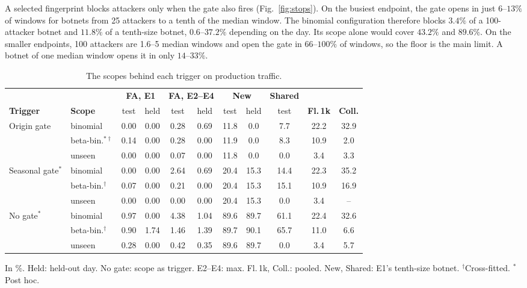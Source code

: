 \documentclass[conference,letterpaper,10pt]{IEEEtran}
\newcommand\1{\textit{(i)}}
\newcommand\2{\textit{(ii)}}
\newcommand\3{\textit{(iii)}}
\newcommand\4{\textit{(iv)}}
\newcommand\5{\textit{(v)}}
\newcommand\6{\textit{(vi)}}
\newcommand\7{\textit{(vii)}}
\newcommand\8{\textit{(viii)}}
\newcommand\9{\textit{(ix)}}
\begin{document}
A selected fingerprint blocks attackers only when the gate also fires
(Fig.~\ref{fig:stops}). On the busiest endpoint,
the gate opens in just $6$--$13\%$ of windows
for botnets from 25 attackers to a tenth of the median
window. The binomial
configuration therefore blocks $3.4\%$
of a 100-attacker botnet and $11.8\%$
of a tenth-size botnet, $0.6$--$37.2\%$ depending on the day.
Its scope alone would cover $43.2\%$ and $89.6\%$.
On the smaller endpoints, 100 attackers are 1.6--5 median
windows and open the gate in $66$--$100\%$ of windows, so
the floor is the main limit. A botnet of one median window
opens it in only $14$--$33\%$.

\begin{table}[t]
\centering
\caption{The scopes behind each trigger on production traffic.}
\label{tab:triggers}
\scriptsize
\setlength{\tabcolsep}{1.8pt}
\begin{tabular}{@{}llccccccccc@{}}
\toprule
 & & \multicolumn{2}{c}{\textbf{FA, E1}} & \multicolumn{2}{c}{\textbf{FA, E2--E4}} & \multicolumn{2}{c}{\textbf{New}} & \textbf{Shared} & & \\
\cmidrule(lr){3-4}\cmidrule(lr){5-6}\cmidrule(lr){7-8}\cmidrule(lr){9-9}
\textbf{Trigger} & \textbf{Scope} & test & held & test & held & test & held & test & \textbf{Fl.\,1k} & \textbf{Coll.} \\
\midrule
Origin gate         & binomial               & 0.00 & 0.00 & 0.28 & 0.69 & 11.8 & 0.0  & 7.7  & 22.2 & 32.9 \\
                    & beta-bin.$^{*\dagger}$ & 0.14 & 0.00 & 0.28 & 0.00 & 11.9 & 0.0  & 8.3  & 10.9 & 2.0 \\
                    & unseen                 & 0.00 & 0.00 & 0.07 & 0.00 & 11.8 & 0.0  & 0.0  & 3.4  & 3.3 \\
\rowcolor[gray]{0.90}
Seasonal gate$^{*}$ & binomial               & 0.00 & 0.00 & 2.64 & 0.69 & 20.4 & 15.3 & 14.4 & 22.3 & 35.2 \\
\rowcolor[gray]{0.90}
                    & beta-bin.$^{\dagger}$  & 0.07 & 0.00 & 0.21 & 0.00 & 20.4 & 15.3 & 15.1 & 10.9 & 16.9 \\
\rowcolor[gray]{0.90}
                    & unseen                 & 0.00 & 0.00 & 0.00 & 0.00 & 20.4 & 15.3 & 0.0  & 3.4  & -- \\
No gate$^{*}$       & binomial               & 0.97 & 0.00 & 4.38 & 1.04 & 89.6 & 89.7 & 61.1 & 22.4 & 32.6 \\
                    & beta-bin.$^{\dagger}$  & 0.90 & 1.74 & 1.46 & 1.39 & 89.7 & 90.1 & 65.7 & 11.0 & 6.6 \\
                    & unseen                 & 0.28 & 0.00 & 0.42 & 0.35 & 89.6 & 89.7 & 0.0  & 3.4  & 5.7 \\
\bottomrule
\end{tabular}

\vspace{2pt}
{\footnotesize In \%. Held: held-out day. No gate: scope as trigger. E2--E4: max. Fl.\,1k, Coll.: pooled. New, Shared: E1's tenth-size botnet. $^{\dagger}$Cross-fitted. $^{*}$Post hoc.}
\end{table}
\end{document}
